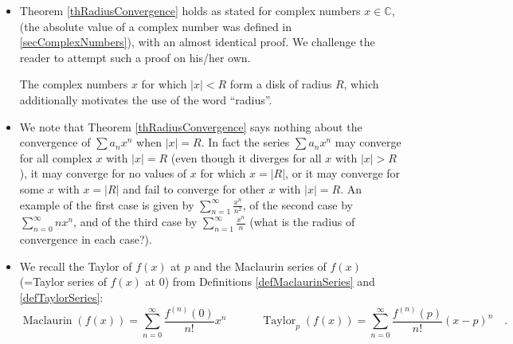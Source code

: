 \documentclass[12pt]{book}
\DeclareMathOperator{\maclaurin}{Maclaurin}
\DeclareMathOperator{\taylor}{Taylor}
\begin{document}
\begin{itemize}
\item Theorem \ref{thRadiusConvergence} holds as stated for complex numbers $x\in \mathbb C$, (the absolute value of a complex number was defined in \ref{secComplexNumbers}), with an almost identical proof. We challenge the reader to attempt such a proof on his/her own.

The complex numbers $x$ for which $|x|<R$ form a disk of radius $R$, which additionally motivates the use of the word ``radius''.  

\item We note that Theorem \ref{thRadiusConvergence} says nothing about the convergence of $\sum a_n x^n$ when $|x|=R$. In fact the series $\sum a_n x^n$ may converge for all complex $x$ with $|x|=R$ (even though it diverges for all $x$ with $|x|>R$), it may converge for no values of $x$ for which $x=|R|$, or it may converge for some $x$ with $x=|R|$ and fail to converge for other $x$ with $|x|=R$. An example of the first case is given by $\sum\limits_{n=1}^\infty  \frac{x^n}{n^2}$, of the second case by  $\sum\limits_{n=0}^\infty  nx^n$, and of the third case by $\sum\limits_{n=1}^\infty  \frac{x^n}{n} $ (what is the radius of convergence in each case?).


\item We recall the Taylor of $f(x)$ at $p$ and the Maclaurin series of $f(x)$ (=Taylor series of $f(x)$ at 0) from Definitions \ref{defMaclaurinSeries} and \ref{defTaylorSeries}:
\[
\maclaurin (f(x))= \sum\limits _{n=0}^\infty \frac{f^{(n)}(0)}{n!}x^n\quad\quad\quad \taylor_p(f(x))=\sum\limits_{n=0}^\infty \frac{f^{(n)}(p)}{n!}(x-p)^n\quad .
\]


\end{itemize}
\end{document}
